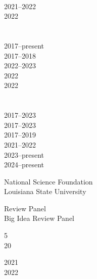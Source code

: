\documentclass[10pt]{designcv}
\begin{document}
\hfill
\begin{minipage}[t]{0.15\textwidth}
\ \\
2021--2022\\
2022\\
\ \\
\ \\
2017--present\\
2017--2018\\
2022--2023\\
2022\\
2022\\
\ \\
\ \\
2017--2023\\
2017--2023\\
2017--2019\\
2021--2022\\
2023--present\\
2024--present\\
\end{minipage}
\hfill



\begin{minipage}[t]{0.35\textwidth}
National Science Foundation\\
Louisiana State University\\
\end{minipage}
\hfill
\begin{minipage}[t]{0.3\textwidth}
Review Panel\\
Big Idea Review Panel\\
\end{minipage}
\hfill
\begin{minipage}[t]{0.1\textwidth}
5\\
20\\
\end{minipage}
\hfill
\begin{minipage}[t]{0.15\textwidth}
2021\\
2022\\
\end{minipage}

\end{document}
